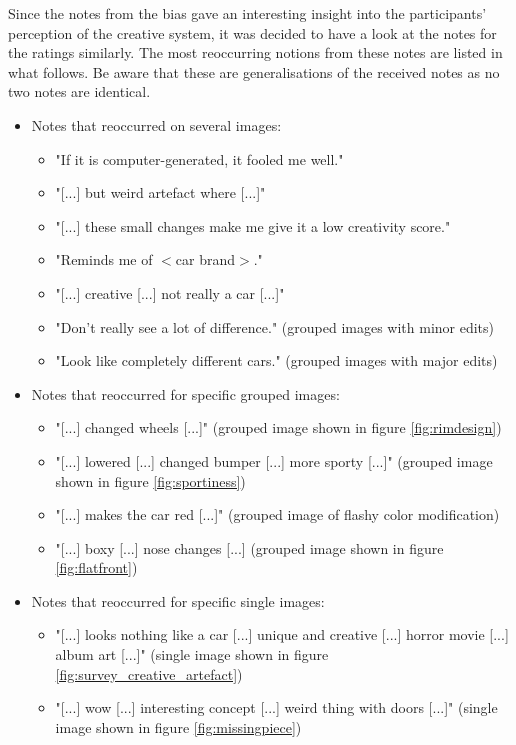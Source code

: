 Since the notes from the bias gave an interesting insight into the participants' perception of the creative system, it was decided to have a look at the notes for the ratings similarly.
The most reoccurring notions from these notes are listed in what follows.
Be aware that these are generalisations of the received notes as no two notes are identical.
\begin{itemize}
    \item Notes that reoccurred on several images:
    \begin{itemize}
        \item "If it is computer-generated, it fooled me well."
        \item "[...] but weird artefact where [...]"
        \item "[...] these small changes make me give it a low creativity score." 
        \item "Reminds me of $<$car brand$>$."
        \item "[...] creative [...] not really a car [...]"
        \item "Don't really see a lot of difference." (grouped images with minor edits)
        \item "Look like completely different cars." (grouped images with major edits)
    \end{itemize}
    \clearpage
    \item Notes that reoccurred for specific grouped images:
    \begin{itemize}
        \item "[...] changed wheels [...]" (grouped image shown in figure \ref{fig:rimdesign})
        \item "[...] lowered [...] changed bumper [...] more sporty [...]" (grouped image shown in figure \ref{fig:sportiness})
        \item "[...] makes the car red [...]" (grouped image of flashy color modification)
        \item "[...] boxy [...] nose changes [...] (grouped image shown in figure \ref{fig:flatfront})
    \end{itemize}
    \item Notes that reoccurred for specific single images:
    \begin{itemize}
        \item "[...] looks nothing like a car [...] unique and creative [...] horror movie [...] album art [...]" (single image shown in figure \ref{fig:survey_creative_artefact})
        \item "[...] wow [...] interesting concept [...] weird thing with doors [...]" (single image shown in figure \ref{fig:missingpiece})

\end{itemize}
\end{itemize}
